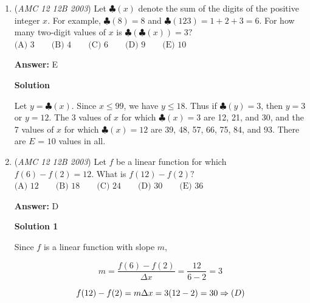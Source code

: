 \begin{enumerate}
 $\text {(A) } 0 \qquad \text {(B) } 13 \qquad \text {(C) } 37 \qquad \text {(D) } 64 \qquad \text {(E) } 83$

 \textbf{Answer: }D



\textbf{Solution}

Where $a,b,c$ is the number of nickels, dimes, and quarters, respectively, we can set up two equations:

 
 \[(1)\ 5a+10b+25c=835\ \ \ \ (2)\ a+b+c=100\]

 Eliminate $a$ by subtracting $(2)$ from $(1)/5$ to get $b+4c=67$. Of the integer solutions $(b,c)$ to this equation, the number of dimes $b$ is least in $(3,16)$ and greatest in $(67,0)$, yielding a difference of $67-3=\boxed{\textbf{(D)}\ 64}$.

 


	\item (\textit{AMC 12 12B 2003}) Let $\clubsuit(x)$ denote the sum of the digits of the positive integer $x$. For example, $\clubsuit(8) = 8$ and $\clubsuit(123) = 1 + 2 + 3 = 6.$ For how many two-digit values of $x$ is $\clubsuit(\clubsuit(x)) = 3?$
$\text{(A) }3\qquad\text{(B) }4\qquad\text{(C) }6\qquad\text{(D) }9\qquad\text{(E) }10$

 \textbf{Answer: }E



\textbf{Solution}

Let $y=\clubsuit (x)$. Since $x \leq 99$, we have $y \leq 18$. Thus if $\clubsuit (y)=3$, then $y=3$ or $y=12$. The 3 values of $x$ for which $\clubsuit (x)=3$ are 12, 21, and 30, and the 7 values of $x$ for which $\clubsuit (x)=12$ are 39, 48, 57, 66, 75, 84, and 93. There are $\boxed{E}$ = $\boxed{10}$ values in all.

 


	\item (\textit{AMC 12 12B 2003}) Let $f$ be a linear function for which $f(6) - f(2) = 12.$ What is $f(12) - f(2)?$
$\text {(A) } 12 \qquad \text {(B) } 18 \qquad \text {(C) } 24 \qquad \text {(D) } 30 \qquad \text {(E) } 36$

 \textbf{Answer: }D



\textbf{Solution 1}

Since $f$ is a linear function with slope $m$,

 
 \[m = \frac{f(6) - f(2)}{\Delta x} = \frac{12}{6 - 2} = 3\]

 \[f(12) - f(2) = m \Delta x = 3(12 - 2) = 30 \Rightarrow \text (D)\]





\end{enumerate}
